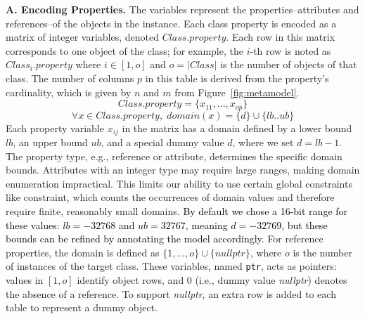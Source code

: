 \textbf{A. Encoding Properties.}
The variables represent the properties--attributes and references--of the objects in the instance.
Each class property is encoded as a matrix of integer variables, denoted $Class.property$. 
Each row in this matrix corresponds to one object of the class; for example, the $i$-th row is noted as $Class_i.property$ where $i \in [1, o]$ and $o = |Class|$ is the number of objects of that class. The number of columns $p$ in this table is derived from the property's cardinality, which is given by $n$ and $m$ from Figure~\ref{fig:metamodel}.
$$\mathit{Class.property} = \{x_{11},...,x_{op}\}$$
$$\forall x \in Class.property,\;domain(x) = \{d\}\cup\{lb..ub\}$$
Each property variable $x_{ij}$ in the matrix has a domain defined by a lower bound $lb$, an upper bound $ub$, and a special dummy value $d$, where we set $d = lb - 1$. The property type, e.g., reference or attribute, determines the specific domain bounds.
Attributes with an integer type may require large ranges, making domain enumeration impractical. This limits our ability to use certain global constraints like  constraint, which counts the occurrences of domain values and therefore require finite, reasonably small domains.
\textcolor{black}{
By default we chose a 16-bit range for these values: $lb=-32768$ and $ub=32767$, meaning $d=-32769$, but these bounds can be refined by annotating the model accordingly\cite{coyle_towards_2025}.
}
For reference properties, the domain is defined as $\{1, \ldots, o\} \cup \{nullptr\}$, where $o$ is the number of instances of the target class. 
These variables, named \texttt{ptr}, acts as pointers: values in $[1, o]$ identify object rows, and $0$ (i.e., dummy value \emph{nullptr}) denotes the absence of a reference. To support \emph{nullptr}, an extra row is added to each table to represent a dummy object.

